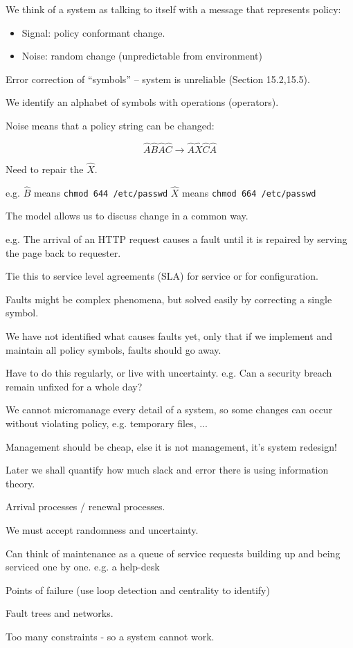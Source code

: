 \documentclass{slides}
\begin{document}

We think of a system as talking to itself with a message that represents
policy:

\begin{itemize}
\item Signal: policy conformant change.
\item Noise: random change (unpredictable from environment)
\end{itemize}


Error correction of ``symbols'' -- system is unreliable (Section 15.2,15.5).


We identify an alphabet of symbols with operations (operators).

Noise means that a policy string can be changed:

$$
\hat A\hat B\hat A\hat C \rightarrow \hat A\hat X\hat C\hat A
$$

Need to repair the $\hat X$.

e.g. $\hat B$ means \verb+chmod 644 /etc/passwd+ $\hat X$ means \verb+chmod 664 /etc/passwd+


The model allows us to discuss change in a common way. 

e.g. The arrival of an HTTP request causes a fault until it is repaired by
serving the page back to requester.

Tie this to service level agreements (SLA) for service or for configuration.



Faults might be complex phenomena, but solved easily by correcting a
single symbol. 

We have not identified what causes faults yet, only that if we implement
and maintain all policy symbols, faults should go away.

Have to do this regularly, or live with uncertainty. e.g. Can a security
breach remain unfixed for a whole day?


We cannot micromanage every detail of a system, so some changes
can occur without violating policy, e.g. temporary files, ...

Management should be cheap, else it is not management, it's system redesign!

Later we shall quantify how much slack and error there is using information theory.



Arrival processes / renewal processes.

We must accept randomness and uncertainty.

Can think of maintenance as a queue of service requests building up
and being serviced one by one. e.g. a help-desk


Points of failure (use loop detection and centrality to identify)

Fault trees and networks.

Too many constraints - so a system cannot work.
\end{document}
